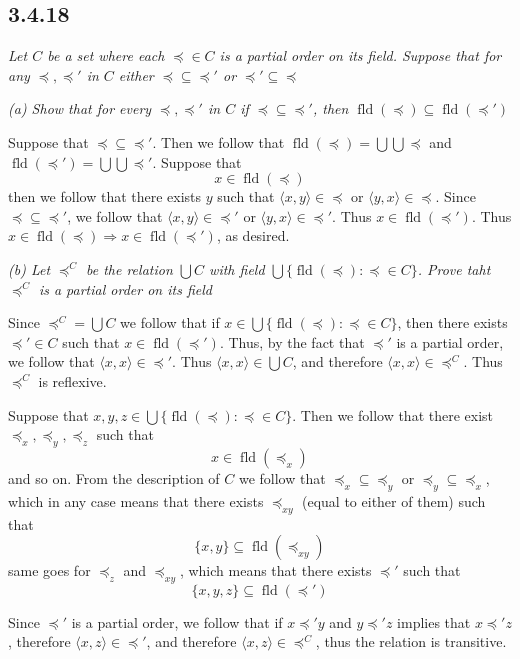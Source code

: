 \documentclass[11pt,oneside,titlepage]{book}
\DeclareMathOperator \fld {fld}
\DeclareMathOperator \ra {\Rightarrow}
\newcommand{\eangle}[1]{\langle #1 \rangle}
\begin{document}
\subsection*{3.4.18}

\textit{Let $C$ be a set where each $\preceq \in C$ is a partial order on its field.
  Suppose that for any $\preceq, \preceq'$ in $C$ either $\preceq \subseteq \preceq'$
  or $\preceq' \subseteq \preceq$}

\textit{(a) Show that for every $\preceq, \preceq'$ in $C$ if $\preceq \subseteq \preceq'$,
  then $\fld(\preceq) \subseteq \fld(\preceq')$}

Suppose that $\preceq \subseteq \preceq'$. Then we follow that
$\fld(\preceq) = \bigcup \bigcup \preceq$ and
$\fld(\preceq') = \bigcup \bigcup \preceq'$. Suppose that
$$x \in \fld(\preceq)$$
then we follow that there exists $y$ such that  $\eangle{x, y} \in \preceq$ or
$\eangle{y, x} \in \preceq$. Since $\preceq \subseteq \preceq'$, we follow
that $\eangle{x, y} \in \preceq'$ or $\eangle{y, x} \in \preceq'$. Thus
$x \in \fld(\preceq')$. Thus $x \in \fld(\preceq) \ra x \in \fld(\preceq')$,
as desired.

\textit{(b) Let $\preceq^C$ be the relation $\bigcup C$ with field
  $\bigcup\{\fld(\preceq): \preceq \in C\}$. Prove taht $\preceq^C$ is a partial order
  on its field}

Since $\preceq^C = \bigcup C$ we follow that if $x \in \bigcup\{\fld(\preceq): \preceq \in C\}$,
then there exists $\preceq' \in C$ such that $x \in \fld(\preceq')$. Thus, by
the fact that $\preceq'$ is a partial order, we follow that $\eangle{x, x} \in \preceq'$. Thus
$\eangle{x, x} \in \bigcup C$, and therefore $\eangle{x, x} \in \preceq^C$. Thus
$\preceq^C$ is reflexive.

Suppose that $x, y, z \in \bigcup\{\fld(\preceq): \preceq \in C\}$. Then we follow that
there exist $\preceq_x, \preceq_y, \preceq_z$ such that
$$x \in \fld(\preceq_x)$$
and so on. From the description of $C$ we follow that $\preceq_x \subseteq \preceq_y$
or $\preceq_y \subseteq \preceq_x$, which in any case means that there exists
$\preceq_{xy}$ (equal to either of them) such that
$$\{x, y\} \subseteq \fld(\preceq_{xy})$$
same goes for $\preceq_z$ and $\preceq_{xy}$, which means that there exists $\preceq'$ such that
$$\{x, y, z\} \subseteq \fld(\preceq')$$

Since $\preceq'$ is a partial order, we follow that if $x \preceq' y$ and $y \preceq' z$
implies that $x \preceq' z$, therefore $\eangle{x, z} \in \preceq'$, and therefore
$\eangle{x, z} \in \preceq^C$, thus the relation is transitive.
\end{document}
